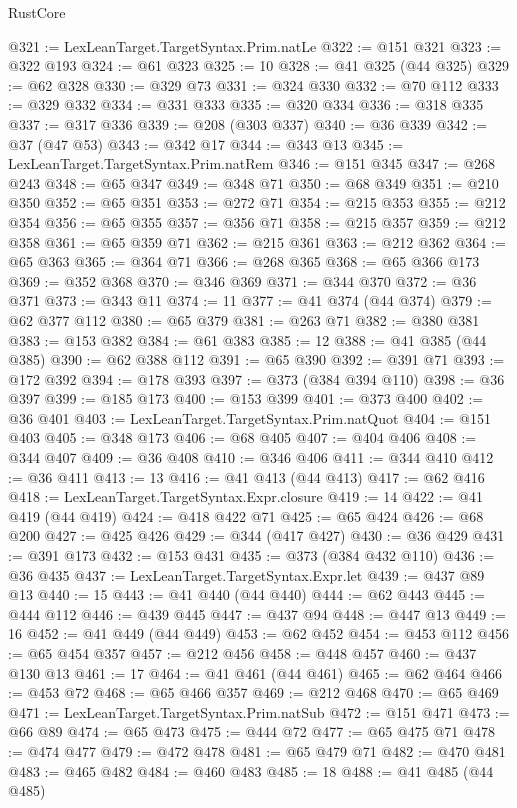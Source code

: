 \begin{lexlean}{RustCore}
\begin{coremodule}
@321 := LexLeanTarget.TargetSyntax.Prim.natLe
@322 := @151 @321
@323 := @322 @193
@324 := @61 @323
@325 := 10
@328 := @41 @325 (@44 @325)
@329 := @62 @328
@330 := @329 @73
@331 := @324 @330
@332 := @70 @112
@333 := @329 @332
@334 := @331 @333
@335 := @320 @334
@336 := @318 @335
@337 := @317 @336
@339 := @208 (@303 @337)
@340 := @36 @339
@342 := @37 (@47 @53)
@343 := @342 @17
@344 := @343 @13
@345 := LexLeanTarget.TargetSyntax.Prim.natRem
@346 := @151 @345
@347 := @268 @243
@348 := @65 @347
@349 := @348 @71
@350 := @68 @349
@351 := @210 @350
@352 := @65 @351
@353 := @272 @71
@354 := @215 @353
@355 := @212 @354
@356 := @65 @355
@357 := @356 @71
@358 := @215 @357
@359 := @212 @358
@361 := @65 @359 @71
@362 := @215 @361
@363 := @212 @362
@364 := @65 @363
@365 := @364 @71
@366 := @268 @365
@368 := @65 @366 @173
@369 := @352 @368
@370 := @346 @369
@371 := @344 @370
@372 := @36 @371
@373 := @343 @11
@374 := 11
@377 := @41 @374 (@44 @374)
@379 := @62 @377 @112
@380 := @65 @379
@381 := @263 @71
@382 := @380 @381
@383 := @153 @382
@384 := @61 @383
@385 := 12
@388 := @41 @385 (@44 @385)
@390 := @62 @388 @112
@391 := @65 @390
@392 := @391 @71
@393 := @172 @392
@394 := @178 @393
@397 := @373 (@384 @394 @110)
@398 := @36 @397
@399 := @185 @173
@400 := @153 @399
@401 := @373 @400
@402 := @36 @401
@403 := LexLeanTarget.TargetSyntax.Prim.natQuot
@404 := @151 @403
@405 := @348 @173
@406 := @68 @405
@407 := @404 @406
@408 := @344 @407
@409 := @36 @408
@410 := @346 @406
@411 := @344 @410
@412 := @36 @411
@413 := 13
@416 := @41 @413 (@44 @413)
@417 := @62 @416
@418 := LexLeanTarget.TargetSyntax.Expr.closure
@419 := 14
@422 := @41 @419 (@44 @419)
@424 := @418 @422 @71
@425 := @65 @424
@426 := @68 @200
@427 := @425 @426
@429 := @344 (@417 @427)
@430 := @36 @429
@431 := @391 @173
@432 := @153 @431
@435 := @373 (@384 @432 @110)
@436 := @36 @435
@437 := LexLeanTarget.TargetSyntax.Expr.let
@439 := @437 @89 @13
@440 := 15
@443 := @41 @440 (@44 @440)
@444 := @62 @443
@445 := @444 @112
@446 := @439 @445
@447 := @437 @94
@448 := @447 @13
@449 := 16
@452 := @41 @449 (@44 @449)
@453 := @62 @452
@454 := @453 @112
@456 := @65 @454 @357
@457 := @212 @456
@458 := @448 @457
@460 := @437 @130 @13
@461 := 17
@464 := @41 @461 (@44 @461)
@465 := @62 @464
@466 := @453 @72
@468 := @65 @466 @357
@469 := @212 @468
@470 := @65 @469
@471 := LexLeanTarget.TargetSyntax.Prim.natSub
@472 := @151 @471
@473 := @66 @89
@474 := @65 @473
@475 := @444 @72
@477 := @65 @475 @71
@478 := @474 @477
@479 := @472 @478
@481 := @65 @479 @71
@482 := @470 @481
@483 := @465 @482
@484 := @460 @483
@485 := 18
@488 := @41 @485 (@44 @485)

\end{coremodule}
\end{lexlean}
